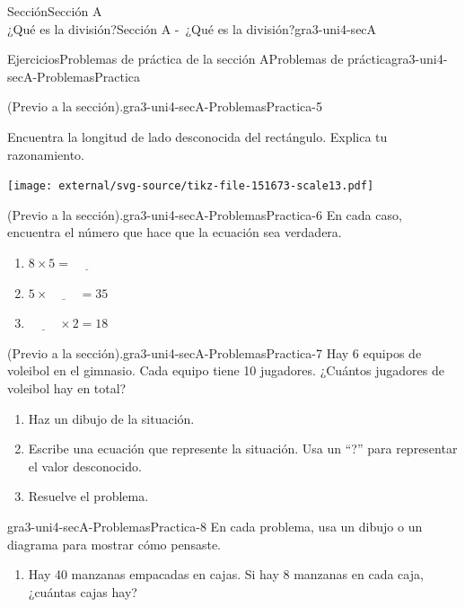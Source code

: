 \begin{sectionptx}{Sección}{{\Large Sección A\\}¿Qué es la división?}{}{Sección A -~¿Qué es la división?}{}{}{gra3-uni4-secA}
\begin{exercises-subsection}{Ejercicios}{Problemas de práctica de la sección A}{}{Problemas de práctica}{}{}{gra3-uni4-secA-ProblemasPractica}
\begin{divisionexercise}{3}{(Previo a la sección).}{}{gra3-uni4-secA-ProblemasPractica-5}
\begin{sidebyside}{2}{0}{0}{0}%
\begin{sbspanel}{0.5}%
Encuentra la longitud de lado desconocida del rectángulo. Explica tu razonamiento.%
\end{sbspanel}%
\begin{sbspanel}{0.5}%
\texttt{[image: external/svg-source/tikz-file-151673-scale13.pdf]}
\end{sbspanel}%
\end{sidebyside}%
\end{divisionexercise}%
\begin{divisionexercise}{4}{(Previo a la sección).}{}{gra3-uni4-secA-ProblemasPractica-6}%
En cada caso, encuentra el número que hace que la ecuación sea verdadera.%
\par
%
\begin{enumerate}[label={(\alph*)}]
\item{}\(\displaystyle 8 \times 5 = \underline{\hspace{1cm}}\)%
\item{}\(\displaystyle 5 \times \underline{\hspace{1cm}} = 35\)%
\item{}\(\displaystyle \underline{\hspace{1cm}} \times 2 = 18\)%
\end{enumerate}
%
\end{divisionexercise}%
\begin{divisionexercise}{5}{(Previo a la sección).}{}{gra3-uni4-secA-ProblemasPractica-7}%
Hay 6 equipos de voleibol en el gimnasio. Cada equipo tiene 10 jugadores. ¿Cuántos jugadores de voleibol hay en total?%
\par
%
\begin{enumerate}[label={(\alph*)}]
\item{}Haz un dibujo de la situación.%
\item{}Escribe una ecuación que represente la situación. Usa un “?” para representar el valor desconocido.%
\item{}Resuelve el problema.%
\end{enumerate}
%
\end{divisionexercise}%
\begin{divisionexercise}{6}{}{}{gra3-uni4-secA-ProblemasPractica-8}%
En cada problema, usa un dibujo o un diagrama para mostrar cómo pensaste.%
\par
%
\begin{enumerate}[label={(\alph*)}]
\item{}Hay 40 manzanas empacadas en cajas. Si hay 8 manzanas en cada caja, ¿cuántas cajas hay?%

\end{enumerate}
\end{divisionexercise}
\end{exercises-subsection}
\end{sectionptx}

